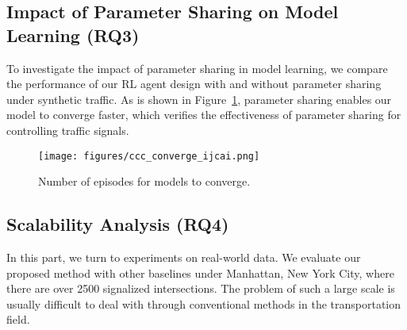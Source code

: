 \subsection{Impact of Parameter Sharing on Model Learning (RQ3)}
To investigate the impact of parameter sharing in model learning, we compare the performance of our RL agent design with and without parameter sharing under synthetic traffic. As is shown in Figure~\ref{fig:convergence}, parameter sharing enables our model to converge faster, which verifies the effectiveness of parameter sharing for controlling traffic signals.

\begin{figure}[htbp]
\centering
\texttt{[image: figures/ccc\_converge\_ijcai.png]}

\caption{Number of episodes for models to converge.}
\label{fig:convergence}
\end{figure}






\subsection{Scalability Analysis (RQ4)}
In this part, we turn to experiments on real-world data. We evaluate our proposed method with other baselines under Manhattan, New York City, where there are over 2500 signalized intersections. The problem of such a large scale is usually difficult to deal with through conventional methods in the transportation field.

